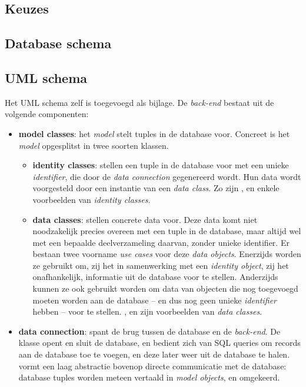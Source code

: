 \documentclass[12pt,a4paper]{article}
\begin{document}
\subsection{Keuzes}

\subsection{Database schema}

\subsection{UML schema}

Het UML schema zelf is toegevoegd als bijlage. De \emph{back-end} bestaat uit de volgende componenten:

\begin{itemize}

\item \textbf{model classes}: het \emph{model} stelt tuples in de database voor. Concreet is het \emph{model} opgesplitst in twee soorten klassen.

\begin{itemize}

\item \textbf{identity classes}: stellen een tuple in de database voor met een unieke \emph{identifier}, die door de \emph{data connection} gegenereerd wordt. Hun data wordt voorgesteld door een instantie van een \emph{data class}. Zo zijn ,  en  enkele voorbeelden van \emph{identity classes}.

\item \textbf{data classes}: stellen concrete data voor. Deze data komt niet noodzakelijk precies overeen met een tuple in de database, maar altijd wel met een bepaalde deelverzameling daarvan, zonder unieke identifier. Er bestaan twee voorname \emph{use cases} voor deze \emph{data objects}. Enerzijds worden ze gebruikt om, zij het in samenwerking met een \emph{identity object}, zij het onafhankelijk, informatie uit de database voor te stellen. Anderzijds kunnen ze ook gebruikt worden om data van objecten die nog toegevoegd moeten worden aan de database -- en dus nog geen unieke \emph{identifier} hebben -- voor te stellen. ,  en  zijn voorbeelden van \emph{data classes}.

\end{itemize}

\item \textbf{data connection}: spant de brug tussen de database en de \emph{back-end}. De  klasse opent en sluit de database, en bedient zich van SQL queries om records aan de database toe te voegen, en deze later weer uit de database te halen.  vormt een laag abstractie bovenop directe communicatie met de database: database tuples worden meteen vertaald in \emph{model objects}, en omgekeerd.


\end{itemize}
\end{document}

